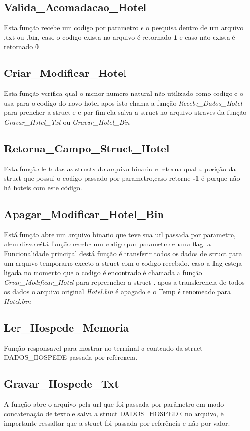 \documentclass{article}
\begin{document}
\subsection{Valida\_Acomadacao\_Hotel}
	Esta função recebe um codigo por parametro e o pesquisa dentro de um arquivo .txt ou .bin, caso o codigo exista no arquivo é retornado \textbf{1} e caso não exista é retornado  \textbf{0}

\subsection{Criar\_Modificar\_Hotel}
	Esta função verifica qual o menor numero natural não utilizado como codigo e o usa para o codigo do novo hotel apos isto  chama a função \textit{Recebe\_Dados\_Hotel} para prencher a struct e e por fim ela salva a struct no arquivo atraves da função \textit{Gravar\_Hotel\_Txt} ou \textit{Gravar\_Hotel\_Bin}

\subsection{Retorna\_Campo\_Struct\_Hotel}
	Esta função le todas as structs do arquivo binário e retorna qual a posição da struct que possui o codigo passado por parametro,caso retorne \textbf{-1} é porque não há hoteis com este código.

\subsection{Apagar\_Modificar\_Hotel\_Bin}
	Está função abre um arquivo binario que teve sua  url passada por parametro, alem disso eśtá função recebe um codigo por parametro e uma flag.
	a Funcionalidade principal destá função é transferir todos os dados de struct para um arquivo temporario exceto a struct com o codigo recebido. caso a flag esteja ligada no momento que o codigo é encontrado é chamada a função \textit{Criar\_Modificar\_Hotel} para repreencher a struct . apos a transferencia de todos os dados o arquivo original \textit{Hotel.bin} é apagado e o Temp é renomeado para \textit{Hotel.bin}


\subsection{Ler\_Hospede\_Memoria}
	Função responsavel para mostrar no terminal o conteudo da struct DADOS\_HOSPEDE passada por  refêrencia.

\subsection{Gravar\_Hospede\_Txt}
	A função abre o arquivo pela url que foi passada por parâmetro em modo concatenação de texto e salva a struct DADOS\_HOSPEDE  no arquivo, é importante ressaltar que  a struct foi passada por referência e não por valor.
\end{document}
